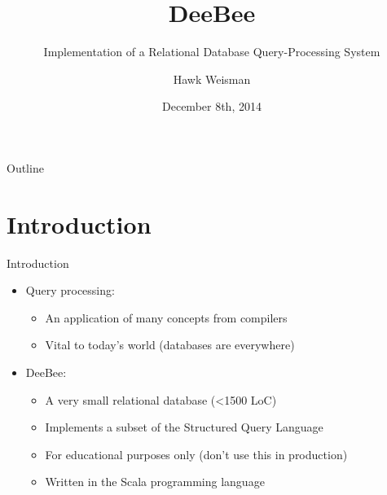 \documentclass{beamer}
\title{DeeBee}
\subtitle{Implementation of a Relational Database Query-Processing System}
\author{Hawk Weisman}
\institute[Allegheny College] %
{Department of Computer Science\\Allegheny College
}
\date{December 8th, 2014}
\begin{document}
\begin{frame}
  \titlepage
\end{frame}

\begin{frame}{Outline}
  \tableofcontents
\end{frame}




\section{Introduction}
\begin{frame}{Introduction}
\begin{itemize}
  \item Query processing:  \pause
  \begin{itemize}
    \item An application of many concepts from compilers \pause
    \item Vital to today's world (databases are everywhere)  \pause
  \end{itemize}
  \item DeeBee: \pause
  \begin{itemize}
    \item A very small relational database (\textless 1500 LoC) \pause
    \item Implements a subset of the Structured Query Language  \pause
    \item For educational purposes only (don't use this in production)  \pause
    \item Written in the Scala programming language  \pause
  \end{itemize}
  \end{itemize}
\end{frame}
\end{document}
